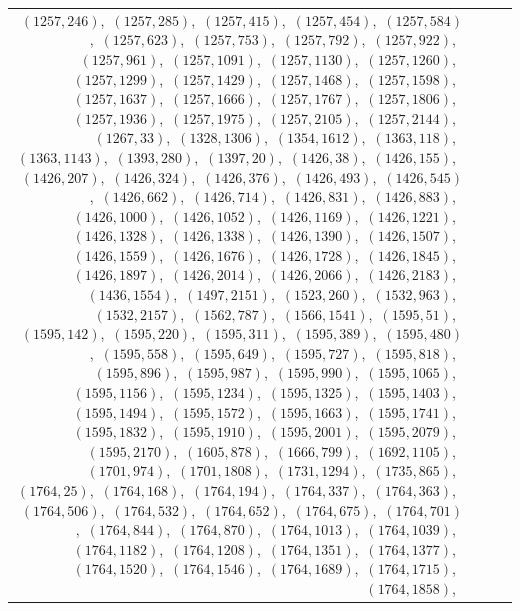 \documentclass[11pt]{article}
\begin{document}
\begin{longtable}{@{}rrl>{\raggedright\arraybackslash}p{}@{}}
$(1257,246)$,\allowbreak\ $(1257,285)$,\allowbreak\ $(1257,415)$,\allowbreak\ $(1257,454)$,\allowbreak\ $(1257,584)$,\allowbreak\ $(1257,623)$,\allowbreak\ $(1257,753)$,\allowbreak\ $(1257,792)$,\allowbreak\ $(1257,922)$,\allowbreak\ $(1257,961)$,\allowbreak\ $(1257,1091)$,\allowbreak\ $(1257,1130)$,\allowbreak\ $(1257,1260)$,\allowbreak\ $(1257,1299)$,\allowbreak\ $(1257,1429)$,\allowbreak\ $(1257,1468)$,\allowbreak\ $(1257,1598)$,\allowbreak\ $(1257,1637)$,\allowbreak\ $(1257,1666)$,\allowbreak\ $(1257,1767)$,\allowbreak\ $(1257,1806)$,\allowbreak\ $(1257,1936)$,\allowbreak\ $(1257,1975)$,\allowbreak\ $(1257,2105)$,\allowbreak\ $(1257,2144)$,\allowbreak\ $(1267,33)$,\allowbreak\ $(1328,1306)$,\allowbreak\ $(1354,1612)$,\allowbreak\ $(1363,118)$,\allowbreak\ $(1363,1143)$,\allowbreak\ $(1393,280)$,\allowbreak\ $(1397,20)$,\allowbreak\ $(1426,38)$,\allowbreak\ $(1426,155)$,\allowbreak\ $(1426,207)$,\allowbreak\ $(1426,324)$,\allowbreak\ $(1426,376)$,\allowbreak\ $(1426,493)$,\allowbreak\ $(1426,545)$,\allowbreak\ $(1426,662)$,\allowbreak\ $(1426,714)$,\allowbreak\ $(1426,831)$,\allowbreak\ $(1426,883)$,\allowbreak\ $(1426,1000)$,\allowbreak\ $(1426,1052)$,\allowbreak\ $(1426,1169)$,\allowbreak\ $(1426,1221)$,\allowbreak\ $(1426,1328)$,\allowbreak\ $(1426,1338)$,\allowbreak\ $(1426,1390)$,\allowbreak\ $(1426,1507)$,\allowbreak\ $(1426,1559)$,\allowbreak\ $(1426,1676)$,\allowbreak\ $(1426,1728)$,\allowbreak\ $(1426,1845)$,\allowbreak\ $(1426,1897)$,\allowbreak\ $(1426,2014)$,\allowbreak\ $(1426,2066)$,\allowbreak\ $(1426,2183)$,\allowbreak\ $(1436,1554)$,\allowbreak\ $(1497,2151)$,\allowbreak\ $(1523,260)$,\allowbreak\ $(1532,963)$,\allowbreak\ $(1532,2157)$,\allowbreak\ $(1562,787)$,\allowbreak\ $(1566,1541)$,\allowbreak\ $(1595,51)$,\allowbreak\ $(1595,142)$,\allowbreak\ $(1595,220)$,\allowbreak\ $(1595,311)$,\allowbreak\ $(1595,389)$,\allowbreak\ $(1595,480)$,\allowbreak\ $(1595,558)$,\allowbreak\ $(1595,649)$,\allowbreak\ $(1595,727)$,\allowbreak\ $(1595,818)$,\allowbreak\ $(1595,896)$,\allowbreak\ $(1595,987)$,\allowbreak\ $(1595,990)$,\allowbreak\ $(1595,1065)$,\allowbreak\ $(1595,1156)$,\allowbreak\ $(1595,1234)$,\allowbreak\ $(1595,1325)$,\allowbreak\ $(1595,1403)$,\allowbreak\ $(1595,1494)$,\allowbreak\ $(1595,1572)$,\allowbreak\ $(1595,1663)$,\allowbreak\ $(1595,1741)$,\allowbreak\ $(1595,1832)$,\allowbreak\ $(1595,1910)$,\allowbreak\ $(1595,2001)$,\allowbreak\ $(1595,2079)$,\allowbreak\ $(1595,2170)$,\allowbreak\ $(1605,878)$,\allowbreak\ $(1666,799)$,\allowbreak\ $(1692,1105)$,\allowbreak\ $(1701,974)$,\allowbreak\ $(1701,1808)$,\allowbreak\ $(1731,1294)$,\allowbreak\ $(1735,865)$,\allowbreak\ $(1764,25)$,\allowbreak\ $(1764,168)$,\allowbreak\ $(1764,194)$,\allowbreak\ $(1764,337)$,\allowbreak\ $(1764,363)$,\allowbreak\ $(1764,506)$,\allowbreak\ $(1764,532)$,\allowbreak\ $(1764,652)$,\allowbreak\ $(1764,675)$,\allowbreak\ $(1764,701)$,\allowbreak\ $(1764,844)$,\allowbreak\ $(1764,870)$,\allowbreak\ $(1764,1013)$,\allowbreak\ $(1764,1039)$,\allowbreak\ $(1764,1182)$,\allowbreak\ $(1764,1208)$,\allowbreak\ $(1764,1351)$,\allowbreak\ $(1764,1377)$,\allowbreak\ $(1764,1520)$,\allowbreak\ $(1764,1546)$,\allowbreak\ $(1764,1689)$,\allowbreak\ $(1764,1715)$,\allowbreak\ $(1764,1858)$,\allowbreak\ 
\end{longtable}
\end{document}

